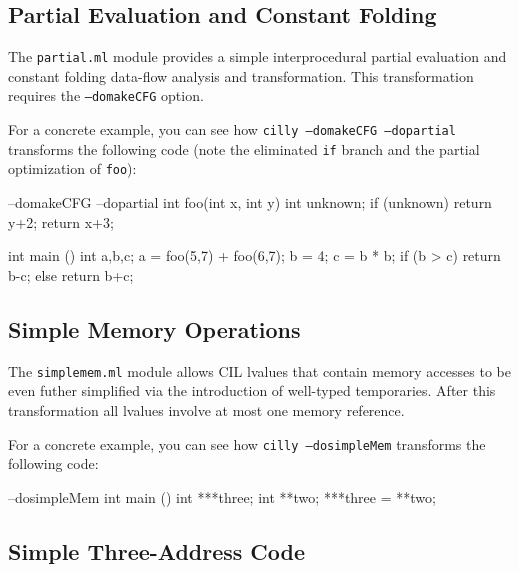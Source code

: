 \documentclass{article}
\def\t#1{{\tt #1}}
\begin{document}
\subsection{Partial Evaluation and Constant Folding} 

The \t{partial.ml} module provides a simple interprocedural partial
evaluation and constant folding data-flow analysis and transformation. This
transformation requires the \t{--domakeCFG} option. 

For a concrete example, you can see how \t{cilly --domakeCFG --dopartial}
transforms the following code (note the eliminated \t{if} branch and the
partial optimization of \t{foo}): 

\begin{cilcode}[global] --domakeCFG --dopartial
  int foo(int x, int y) {
    int unknown;
    if (unknown)
      return y+2;     
    return x+3;      
  }

  int main () {
    int a,b,c;
    a = foo(5,7) + foo(6,7);
    b = 4;
    c = b * b;      
    if (b > c)     
      return b-c;
    else
      return b+c; 
  }
\end{cilcode}

\subsection{Simple Memory Operations} 

The \t{simplemem.ml} module allows CIL lvalues that contain memory accesses
to be even futher simplified via the introduction of well-typed
temporaries. After this transformation all lvalues involve at
most one memory reference. 

For a concrete example, you can see how \t{cilly --dosimpleMem} 
transforms the following code:

\begin{cilcode}[global] --dosimpleMem
  int main () {
    int ***three;
    int **two;
    ***three = **two; 
  } 
\end{cilcode}

\subsection{Simple Three-Address Code} 
\end{document}
